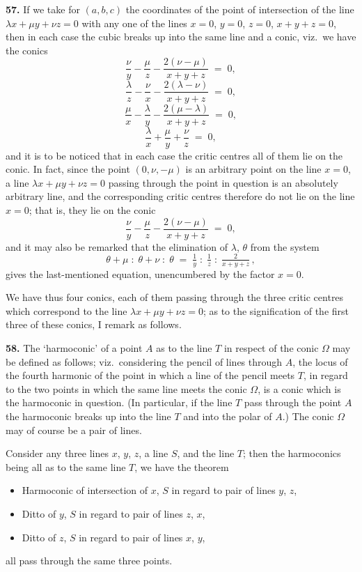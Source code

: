 \documentclass[11pt,a4paper]{article}
\begin{document}
\textbf{57.} If we take for $(a,b,c)$ the coordinates of the point of intersection of the line $\lambda x + \mu y + \nu z = 0$ with any one of the lines $x=0$, $y=0$, $z=0$, $x+y+z=0$, then in each case the cubic breaks up into the same line and a conic, viz.\ we have the conics
\[
\frac{\nu}{y} - \frac{\mu}{z} - \frac{2(\nu-\mu)}{x+y+z} \;=\; 0,
\]
\[
\frac{\lambda}{z} - \frac{\nu}{x} - \frac{2(\lambda-\nu)}{x+y+z} \;=\; 0,
\]
\[
\frac{\mu}{x} - \frac{\lambda}{y} - \frac{2(\mu-\lambda)}{x+y+z} \;=\; 0,
\]
\[
\frac{\lambda}{x} + \frac{\mu}{y} + \frac{\nu}{z} \;=\; 0,
\]
and it is to be noticed that in each case the critic centres all of them lie on the conic. In fact, since the point $(0,\nu,-\mu)$ is an arbitrary point on the line $x=0$, a line $\lambda x + \mu y + \nu z = 0$ passing through the point in question is an absolutely arbitrary line, and the corresponding critic centres therefore do not lie on the line $x=0$; that is, they lie on the conic
\[
\frac{\nu}{y} - \frac{\mu}{z} - \frac{2(\nu-\mu)}{x+y+z} \;=\; 0,
\]
and it may also be remarked that the elimination of $\lambda$, $\theta$ from the system
\[
\theta+\mu \;:\; \theta+\nu \;:\; \theta \;=\; \tfrac{1}{y} \;:\; \tfrac{1}{z} \;:\; \tfrac{2}{x+y+z}\,,
\]
gives the last-mentioned equation, unencumbered by the factor $x = 0$.

We have thus four conics, each of them passing through the three critic centres which correspond to the line $\lambda x + \mu y + \nu z = 0$; as to the signification of the first three of these conics, I remark as follows.

\medskip

\textbf{58.} The `harmoconic' of a point $A$ as to the line $T$ in respect of the conic $\Omega$ may be defined as follows; viz.\ considering the pencil of lines through $A$, the locus of the fourth harmonic of the point in which a line of the pencil meets $T$, in regard to the two points in which the same line meets the conic $\Omega$, is a conic which is the harmoconic in question. (In particular, if the line $T$ pass through the point $A$ the harmoconic breaks up into the line $T$ and into the polar of $A$.) The conic $\Omega$ may of course be a pair of lines.

Consider any three lines $x$, $y$, $z$, a line $S$, and the line $T$; then the harmoconics being all as to the same line $T$, we have the theorem
\begin{itemize}\itemsep0pt
\item Harmoconic of intersection of $x$, $S$ in regard to pair of lines $y$, $z$,
\item Ditto of $y$, $S$ in regard to pair of lines $z$, $x$,
\item Ditto of $z$, $S$ in regard to pair of lines $x$, $y$,
\end{itemize}
all pass through the same three points.
\end{document}
